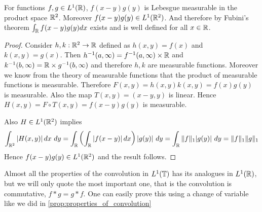   \begin{proposition}
    For functions $f, g \in L^1(\mathbb R)$, $f(x-y)g(y)$ is Lebesgue measurable in the product space $\mathbb R^2$. Moreover $f(x-y)g(y) \in L^1(\mathbb R^2)$. And therefore by Fubini's theorem $\int_\mathbb R f(x-y)g(y) dx$ exists and is well defined for all $x \in \mathbb R$. 
  \end{proposition}
  \begin{proof}
    Consider $h, k : \mathbb R^2 \to \mathbb R$ defined as $h(x, y) = f(x)$ and $k(x, y) = g(x)$. Then $h^{-1}(a, \infty) = f^{-1}(a, \infty) \times \mathbb R$ and $k^{-1}(b, \infty) = \mathbb R \times g^{-1}(b, \infty)$ and therefore $h, k$ are measurable functions. Moreover we know from the theory of measurable functions that the product of measurable functions is measurable. Therefore $F(x, y) = h(x, y)k(x, y) = f(x)g(y)$ is measurable. Also the map $T(x, y) = (x-y, y)$ is linear. Hence $H(x, y) = F\circ T(x, y) = f(x-y)g(y)$ is measurable. 

    Also $H \in L^1(\mathbb R^2)$ implies $$\int_{\mathbb R^2} \left|H(x, y)\right| dx \ dy  = \int_\mathbb R \left( \int_\mathbb R \left|f(x-y)\right| dx \right)|g(y)| \ dy = \int_\mathbb R \|f\|_1 |g(y)| \ dy = \|f\|_1\|g\|_1$$
   Hence $f(x-y)g(y) \in L^1(\mathbb R^2)$ and the result follows.
    
  \end{proof}

  Almost all the properties of the convolution in $L^1(\mathbb T)$ has its analogues in $L^1(\mathbb R)$, but we will only quote the most important one, that is the convolution is commutative, $f*g = g*f$. One can easily prove this using a change of variable like we did in \autoref{prop:properties_of_convolution}

